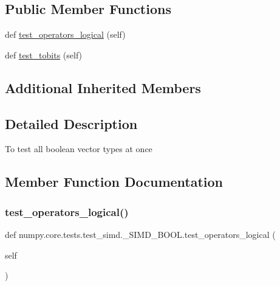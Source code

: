 \subsection*{Public Member Functions}
\begin{DoxyCompactItemize}
\item 
def \hyperlink{classnumpy_1_1core_1_1tests_1_1test__simd_1_1__SIMD__BOOL_a703e7970cb4bc0fbda061f874438d481}{test\+\_\+operators\+\_\+logical} (self)
\item 
def \hyperlink{classnumpy_1_1core_1_1tests_1_1test__simd_1_1__SIMD__BOOL_a1d691dfc0b1787fb23075f5aa1584c44}{test\+\_\+tobits} (self)
\end{DoxyCompactItemize}
\subsection*{Additional Inherited Members}


\subsection{Detailed Description}
\begin{DoxyVerb}To test all boolean vector types at once
\end{DoxyVerb}
 

\subsection{Member Function Documentation}
\mbox{\label{classnumpy_1_1core_1_1tests_1_1test__simd_1_1__SIMD__BOOL_a703e7970cb4bc0fbda061f874438d481}} 
\subsubsection{\texorpdfstring{test\+\_\+operators\+\_\+logical()}{test\_operators\_logical()}}
{\footnotesize\ttfamily def numpy.\+core.\+tests.\+test\+\_\+simd.\+\_\+\+S\+I\+M\+D\+\_\+\+B\+O\+O\+L.\+test\+\_\+operators\+\_\+logical (\begin{DoxyParamCaption}\item[{}]{self }\end{DoxyParamCaption})}

